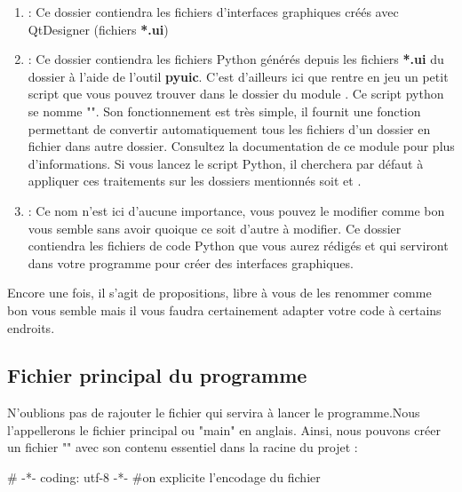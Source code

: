 {\begin{enumerate}
\item {} : Ce dossier contiendra les fichiers d'interfaces graphiques créés avec QtDesigner (fichiers \textbf{*.ui})\newline

\item {} : Ce dossier contiendra les fichiers Python générés depuis les fichiers \textbf{*.ui} du dossier  à l'aide de l'outil \textbf{pyuic}.\newline
C'est d'ailleurs ici que rentre en jeu un petit script que vous pouvez trouver dans le dossier du module . Ce script python se nomme "". Son fonctionnement est très simple, il fournit une fonction permettant de convertir automatiquement tous les fichiers  d'un dossier en fichier  dans autre dossier. Consultez la documentation de ce module pour plus d'informations.\newline
Si vous lancez le script Python, il cherchera par défaut à appliquer ces traitements sur les dossiers mentionnés soit  et .

\item {} : Ce nom n'est ici d'aucune importance, vous pouvez le modifier comme bon vous semble sans avoir quoique ce soit d'autre à modifier.\newline
Ce dossier contiendra les fichiers de code Python que vous aurez rédigés et qui serviront dans votre programme pour créer des interfaces graphiques.

\end{enumerate}

Encore une fois, il s'agit de propositions, libre à vous de les renommer comme bon vous semble mais il vous faudra certainement adapter votre code à certains endroits.

\subsection{Fichier principal du programme}

N'oublions pas de rajouter le fichier qui servira à lancer le programme.Nous l'appellerons le fichier principal ou "main" en anglais.\newline
Ainsi, nous pouvons créer un fichier "" avec son contenu essentiel dans la racine du projet :

\begin{Python}
# -*- coding: utf-8 -*-
#on explicite l'encodage du fichier


\end{Python}}
